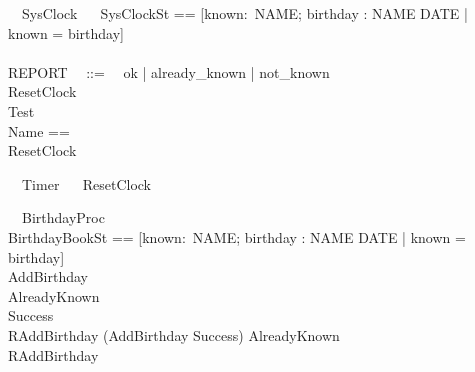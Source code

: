 \documentclass{llncs}
\begin{document}
\begin{circus}
\circprocess\ ~SysClock ~\circdef~ 
\circbegin
\circstate SysClockSt == [known:\power~NAME; birthday : NAME \pfun DATE | known = \dom birthday]\\
  [NAME,DATE]\\
  REPORT ~~::=~~ ok | already\_known | not\_known\\
  ResetClock ~\circdef~\Skip\\
  Test ~\circdef~\Skip\\
  \circnameset Name == {}\\
  \circspot ResetClock
  \circend
\end{circus}
\begin{circus}%
  \circprocess\ ~Timer ~\circdef~\circbegin
  ResetClock ~\circdef~\Skip
  \circspot \Skip
  \circend
\end{circus}
\begin{circus}%
  \circprocess\ ~BirthdayProc ~\circdef~\circbegin\\
  \circstate BirthdayBookSt == [known:\power~NAME; birthday : NAME \pfun DATE | known = \dom birthday]\\
  AddBirthday \circdef [ \Delta BirthdayBook; name? : NAME; date? : DATE | name? \notin known \land birthday' = birthday \cup \{name? \mapsto date?\} ]\\
  AlreadyKnown \circdef [ \Xi BirthdayBook; name? : NAME; result! : REPORT | name? \in known \land result! = already\_known ]\\
  Success \circdef [result! : REPORT | result! = ok ]\\
  RAddBirthday \circdef (AddBirthday \land Success) \lor AlreadyKnown\\
  \circspot RAddBirthday\\
  \circend
\end{circus}
\end{document}
